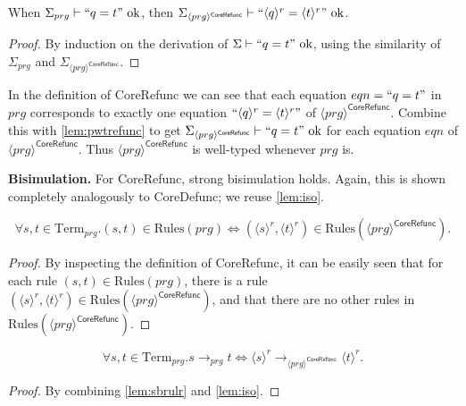 \begin{lemma}
\label{lem:pwtrefunc}
When $\Sigma_{prg} \vdash `` q = t " \textrm{ ok}$, then $\Sigma_{\langle prg \rangle^{\textsf{CoreRefunc}}} \vdash `` \langle q \rangle^r = \langle t \rangle^r " \textrm{ ok}$.
\begin{proof}
By induction on the derivation of $\Sigma \vdash `` q = t " \textrm{ ok}$, using the similarity of $\Sigma_{prg}$ and $\Sigma_{\langle prg \rangle^{\textsf{CoreRefunc}}}$.
\end{proof}
\end{lemma}

In the definition of \textsf{CoreRefunc} we can see that each equation $eqn = `` q = t "$ in $prg$ corresponds to exactly one equation $`` \langle q \rangle^r = \langle t \rangle^r "$ of $\langle prg \rangle^{\textsf{CoreRefunc}}$. Combine this with \autoref{lem:pwtrefunc} to get $\Sigma_{\langle prg \rangle^{\textsf{CoreRefunc}}} \vdash `` q = t " \textrm{ ok}$ for each equation $eqn$ of $\langle prg \rangle^{\textsf{CoreRefunc}}$. Thus $\langle prg \rangle^{\textsf{CoreRefunc}}$ is well-typed whenever $prg$ is.

\textbf{Bisimulation.} For \textsf{CoreRefunc}, strong bisimulation holds. Again, this is shown completely analogously to \textsf{CoreDefunc}; we reuse \autoref{lem:iso}.

\begin{lemma}
\label{lem:sbrulr}
\[
\forall s,t \in \textrm{Term}_{prg}. (s, t) \in \textrm{Rules}(prg) \iff (\langle s \rangle^r, \langle t \rangle^r) \in \textrm{Rules}(\langle prg \rangle^{\textsf{CoreRefunc}}).
\]
\begin{proof}
By inspecting the definition of \textsf{CoreRefunc}, it can be easily seen that for each rule $(s, t) \in \textrm{Rules}(prg)$, there is a rule $(\langle s \rangle^r, \langle t \rangle^r) \in \textrm{Rules}(\langle prg \rangle^{\textsf{CoreRefunc}})$, and that there are no other rules in $\textrm{Rules}(\langle prg \rangle^{\textsf{CoreRefunc}})$.
\end{proof}
\end{lemma}

\begin{corollary}
\[
\forall s,t \in \textrm{Term}_{prg}. s \longrightarrow_{prg} t \iff \langle s \rangle^r \longrightarrow_{\langle prg \rangle^{\textsf{CoreRefunc}}} \langle t \rangle^r.
\]
\begin{proof}
By combining \autoref{lem:sbrulr} and \autoref{lem:iso}.
\end{proof}
\end{corollary}
